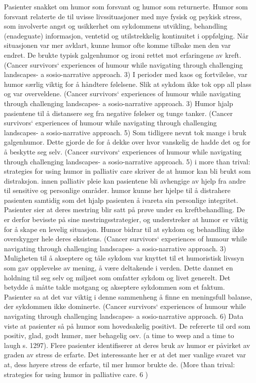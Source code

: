Pasienter snakket om humor som forsvant og humor som returnerte. Humor som
forsvant relaterte de til uvisse livssituasjoner med mye fysisk og psykisk
stress, som involverte angst og usikkerhet om sykdommens utvikling, behandling
(enadeguate) informasjon, ventetid og utilstrekkelig kontinuitet i oppfølging.
Når situasjonen var mer avklart, kunne humor ofte komme tilbake men den var
endret. De brukte typisk galgenhumor og ironi rettet mot erfaringene av kreft.
(Cancer survivors` experiences of humour while navigating through challenging
landscapes-  a sosio-narrative approach. 3) I perioder med kaos og fortvilelse,
var humor særlig viktig for å håndtere følelsene. Slik at sykdom ikke tok opp
all plass og var overveldene.  (Cancer survivors` experiences of humour while
navigating through challenging landscapes-  a sosio-narrative approach. 3)
Humor hjalp pasientene til å distansere seg fra negative følelser og tunge
tanker.  (Cancer survivors` experiences of humour while navigating through
challenging landscapes-  a sosio-narrative approach. 5) Som tidligere nevnt tok
mange i bruk galgenhumor. Dette gjorde de for å dekke over hvor vanskelig de
hadde det og for å beskytte seg selv. (Cancer survivors` experiences of humour
while navigating through challenging landscapes-  a sosio-narrative approach.
5) i more than trival: strategies for using humor in palliativ care skriver de
at humor kan bli brukt som distraksjon. innen palliativ pleie kan pasientene
bli avhengige av hjelp fra andre til sensitive og personlige områder. humor
kunne her hjelpe til å distrahere pasienten samtidig som det hjalp pasienten å
ivareta sin personlige integritet.  Pasienter sier at deres mestring blir satt
på prøve under en kreftbehandling. De er derfor bevisste på sine
mestringsstrategier, og understreker at humor er viktig for å skape en levelig
situasjon. Humor bidrar til at sykdom og behandling ikke overskygger hele deres
eksistens.  (Cancer survivors` experiences of humour while navigating through
challenging landscapes-  a sosio-narrative approach. 3) Muligheten til å
akseptere og tåle sykdom var knyttet til et humoristisk livssyn som gav
opplevelse av mening, å være deltakende i verden. Dette dannet en holdning til
seg selv og miljøet som omfatter sykdom og livet generelt. Det betydde å måtte
takle motgang og akseptere sykdommen som et faktum. Pasienter sa at det var
viktig i denne sammenheng å finne en meningsfull balanse, der sykdommen ikke
dominerte.  (Cancer survivors` experiences of humour while navigating through
challenging landscapes-  a sosio-narrative approach. 6)  Data viste at
pasienter så på humor som hovedsakelig positivt. De refererte til ord som
positiv, glad, godt humør, mer behagelig osv. (a time to weep and a time to
laugh s. 1297). Flere pasienter identifiserer at deres bruk av humor er
påvirket av graden av stress de erfarte. Det interessante her er at det mer
vanlige svaret var at, dess høyere stress de erfarte, til mer humor brukte de.
(More than trival: strategies for using humor in palliative care. 6 ) 

